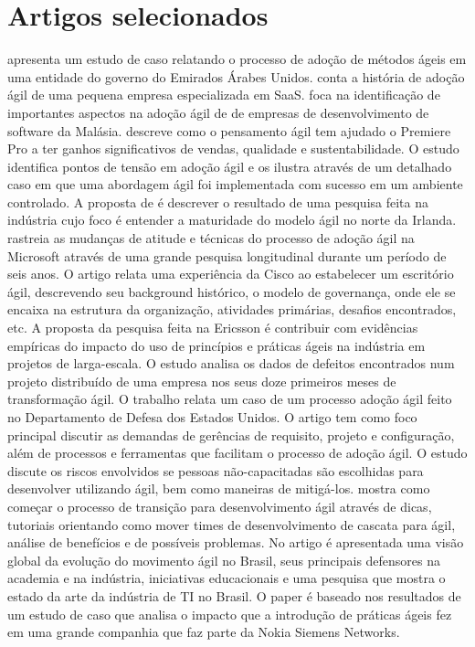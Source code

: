 	\section{Artigos selecionados}
		\cite{Hajjdiab2011} apresenta um estudo de caso relatando o processo de adoção de métodos ágeis em uma entidade do governo do Emirados Árabes Unidos. \cite{Block2011} conta a história de adoção ágil de uma pequena empresa especializada em SaaS. \cite{Asnawi2012} foca na identificação de importantes aspectos na adoção ágil de de empresas de desenvolvimento de software da Malásia. \cite{Adobe2012} descreve como o pensamento ágil tem ajudado o Premiere Pro a ter ganhos significativos de vendas, qualidade e sustentabilidade. O estudo \cite{Fitzgerald2013} identifica pontos de tensão em adoção ágil e os ilustra através de um detalhado caso em que uma abordagem ágil foi implementada com sucesso em um ambiente controlado. A proposta de \cite{Bustard2013} é descrever o resultado de uma pesquisa feita na indústria cujo foco é entender a maturidade do modelo ágil no norte da Irlanda. \cite{Microsoft2013} rastreia as mudanças de atitude e técnicas do processo de adoção ágil na Microsoft através de uma grande pesquisa longitudinal durante um período de seis anos. O artigo \cite{Cisco2011} relata uma experiência da Cisco ao estabelecer um escritório ágil, descrevendo seu background histórico, o modelo de governança, onde ele se encaixa na estrutura da organização, atividades primárias, desafios encontrados, etc. A proposta da pesquisa \cite{Ericsson2013} feita na Ericsson é contribuir com evidências empíricas do impacto do uso de princípios e práticas ágeis na indústria em projetos de larga-escala. O estudo \cite{Korhonen2010} analisa os dados de defeitos encontrados num projeto distribuído de uma empresa nos seus doze primeiros meses de transformação ágil. O trabalho \cite{Lapham2012} relata um caso de um processo adoção ágil feito no Departamento de Defesa dos Estados Unidos. O artigo \cite{Arikpo2011} tem como foco principal discutir as demandas de gerências de requisito, projeto e configuração, além de processos e ferramentas que facilitam o processo de adoção ágil. O estudo \cite{Radha2012} discute os riscos envolvidos se pessoas não-capacitadas são escolhidas para desenvolver utilizando ágil, bem como maneiras de mitigá-los. \cite{Eunha2012} mostra como começar o processo de transição para desenvolvimento ágil através de dicas, tutoriais orientando como mover times de desenvolvimento de cascata para ágil, análise de benefícios e de possíveis problemas. No artigo \cite{Claudia2013} é apresentada uma visão global da evolução do movimento ágil no Brasil, seus principais defensores na academia e na indústria, iniciativas educacionais e uma pesquisa que mostra o estado da arte da indústria de TI no Brasil. O paper \cite{Nokia2013} é baseado nos resultados de um estudo de caso que analisa o impacto que a introdução de práticas ágeis fez em uma grande companhia que faz parte da Nokia Siemens Networks. 
